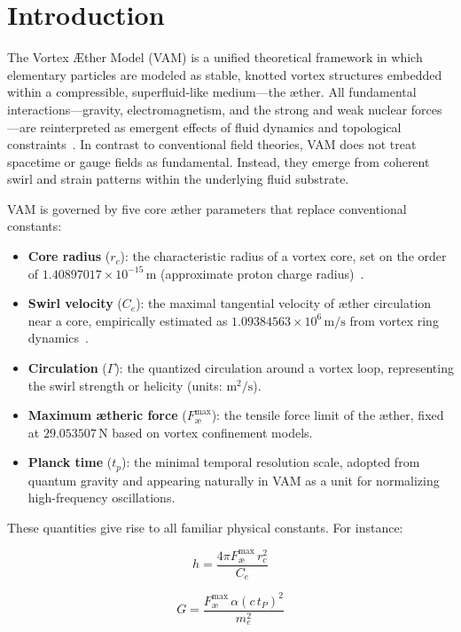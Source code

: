 \section{Introduction}

The Vortex Æther Model (VAM) is a unified theoretical framework in which elementary particles are modeled as stable, knotted vortex structures embedded within a compressible, superfluid-like medium---the \ae ther. All fundamental interactions—gravity, electromagnetism, and the strong and weak nuclear forces—are reinterpreted as emergent effects of fluid dynamics and topological constraints~\cite{VAM4}. In contrast to conventional field theories, VAM does not treat spacetime or gauge fields as fundamental. Instead, they emerge from coherent swirl and strain patterns within the underlying fluid substrate.

VAM is governed by five core æther parameters that replace conventional constants:

\begin{itemize}
    \item \textbf{Core radius} (\(r_c\)): the characteristic radius of a vortex core, set on the order of \(1.40897017 \times 10^{-15}\,\mathrm{m}\) (approximate proton charge radius)~\cite{VAM4}.
    \item \textbf{Swirl velocity} (\(C_e\)): the maximal tangential velocity of æther circulation near a core, empirically estimated as \(1.09384563 \times 10^6\,\mathrm{m/s}\) from vortex ring dynamics~\cite{VAM4}.
    \item \textbf{Circulation} (\(\Gamma\)): the quantized circulation around a vortex loop, representing the swirl strength or helicity (units: \(\mathrm{m}^2/\mathrm{s}\)).
    \item \textbf{Maximum ætheric force} (\( F^{\max}_\text{\ae}\)): the tensile force limit of the æther, fixed at \(29.053507\,\mathrm{N}\) based on vortex confinement models.
    \item \textbf{Planck time} (\(t_p\)): the minimal temporal resolution scale, adopted from quantum gravity and appearing naturally in VAM as a unit for normalizing high-frequency oscillations.
\end{itemize}

\vspace{0.5em}
\noindent These quantities give rise to all familiar physical constants. For instance:

\begin{minipage}{0.48\textwidth}
\begin{equation}
\boxed{
h = \frac{4\pi F^{\max}_\text{\ae}\,r_c^{2}}{C_e}
}
\label{eq:plancks-constants}
\end{equation}
\end{minipage}
\hfill
\begin{minipage}{0.48\textwidth}
\begin{equation}
\boxed{
G = \frac{ F^{\max}_\text{\ae}\,\alpha(c\,t_P)^2}{m_e^2}
}
\label{eq:newtons-constants}
\end{equation}
\end{minipage}

